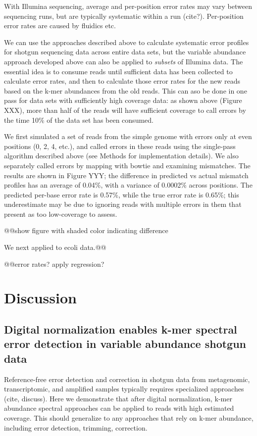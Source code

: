 \documentclass{article}
\begin{document}
With Illumina sequencing, average and per-position error rates may
vary between sequencing runs, but are typically systematic within a
run (cite?).  Per-position error rates are caused by fluidics etc.

We can use the approaches described above to calculate systematic
error profiles for shotgun sequencing data across entire data sets,
but the variable abundance approach developed above can also be
applied to {\em subsets} of Illumina data.  The essential idea is to
consume reads until sufficient data has been collected to calculate
error rates, and then to calculate those error rates for the new reads
based on the k-mer abundances from the old reads.  This can aso be
done in one pass for data sets with sufficiently high coverage data:
as shown above (Figure XXX), more than half of the reads will have
sufficient coverage to call errors by the time 10\% of the data set
has been consumed.

We first simulated a set of reads from the simple genome with errors
only at even positions (0, 2, 4, etc.), and called errors in these
reads using the single-pass algorithm described above (see Methods for
implementation details).  We also separately called errors by mapping
with bowtie and examining mismatches.  The results are shown in Figure
YYY; the difference in predicted vs actual mismatch profiles has an
average of 0.04\%, with a variance of 0.0002\% across positions.  The
predicted per-base error rate is 0.57\%, while the true error rate is
0.65\%; this underestimate may be due to ignoring reads with multiple
errors in them that present as too low-coverage to assess.

@@show figure with shaded color indicating difference

We next applied to ecoli data.@@

@@error rates? apply regression?

\section{Discussion}

\subsection{Digital normalization enables k-mer spectral error detection in variable abundance shotgun data}

Reference-free error detection and correction in shotgun data from
metagenomic, transcriptomic, and amplified samples typically requires
specialized approaches (cite, discuss).  Here we demonstrate that
after digital normalization, k-mer abundance spectral approaches can
be applied to reads with high estimated coverage.  This should
generalize to any approaches that rely on k-mer abundance, including
error detection, trimming, correction.
\end{document}
